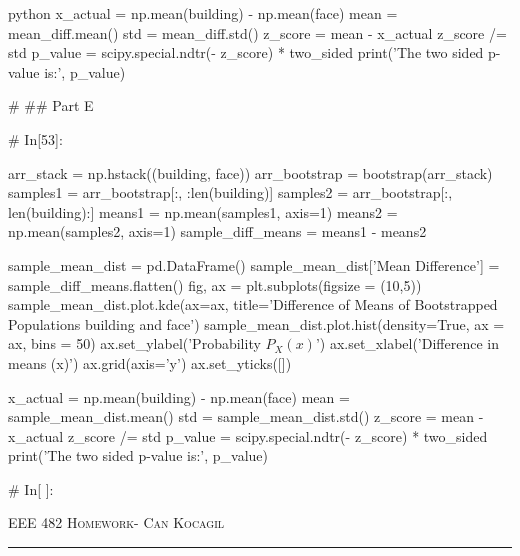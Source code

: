 \documentclass[12pt]{amsart}
\begin{document}
\begin{mintedbox}{python}
x_actual = np.mean(building) - np.mean(face)
mean = mean_diff.mean()
std = mean_diff.std()
z_score = mean - x_actual
z_score /= std
p_value = scipy.special.ndtr(- z_score) * two_sided
print('The two sided p-value is:', p_value)


# ## Part E

# In[53]:


arr_stack = np.hstack((building, face))
arr_bootstrap = bootstrap(arr_stack)
samples1 = arr_bootstrap[:, :len(building)]
samples2 = arr_bootstrap[:, len(building):]
means1 = np.mean(samples1, axis=1)
means2 = np.mean(samples2, axis=1)
sample_diff_means = means1 - means2


sample_mean_dist = pd.DataFrame()
sample_mean_dist['Mean Difference'] = sample_diff_means.flatten()
fig, ax = plt.subplots(figsize = (10,5))
sample_mean_dist.plot.kde(ax=ax, title='Difference of Means of Bootstrapped Populations building and face')
sample_mean_dist.plot.hist(density=True, ax = ax, bins = 50)
ax.set_ylabel('Probability $P_X(x)$')
ax.set_xlabel('Difference in means (x)')
ax.grid(axis='y')
ax.set_yticks([])



x_actual = np.mean(building) - np.mean(face)
mean = sample_mean_dist.mean()
std = sample_mean_dist.std()
z_score = mean - x_actual
z_score /= std
p_value = scipy.special.ndtr(- z_score) * two_sided
print('The two sided p-value is:', p_value)


# In[ ]:





\end{mintedbox}


\newpage
{\scshape EEE 482} \hfill {\scshape \large  Homework-\relax} \hfill {\scshape Can Kocagil}
\smallskip
\hrule
\vspace{2mm}

\printbibliography
\end{document}
